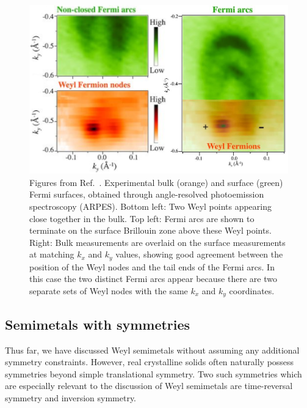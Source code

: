 \begin{figure}[htb!]
	\centering
	\includegraphics[width=.6\linewidth]{Images/TaAs_experiment}
	\caption{Figures from Ref.~\cite{Xu_WSM-experiment}. Experimental bulk (orange) and surface (green) Fermi surfaces, obtained through angle-resolved photoemission spectroscopy (ARPES). Bottom left: Two Weyl points appearing close together in the bulk. Top left: Fermi arcs are shown to terminate on the surface Brillouin zone above these Weyl points. Right: Bulk measurements are overlaid on the surface measurements at matching $k_x$ and $k_y$ values, showing good agreement between the position of the Weyl nodes and the tail ends of the Fermi arcs. In this case the two distinct Fermi arcs appear because there are two separate sets of Weyl nodes with the same $k_x$ and $k_y$ coordinates.}
	\label{fig:TaAs_experiment}
\end{figure}


\subsection{Semimetals with symmetries}

Thus far, we have discussed Weyl semimetals without assuming any additional symmetry constraints. However, real crystalline solids often naturally possess symmetries beyond simple translational symmetry. Two such symmetries which are especially relevant to the discussion of Weyl semimetals are time-reversal symmetry and inversion symmetry.


